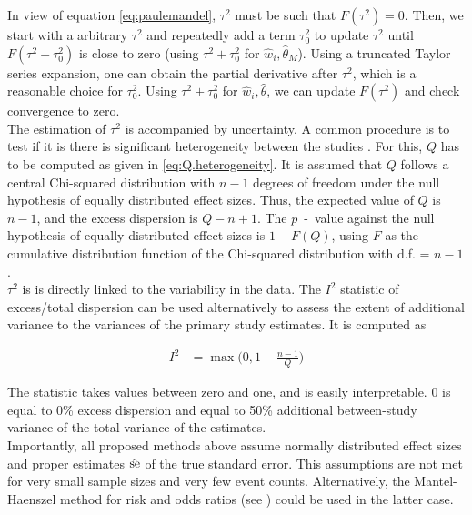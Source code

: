 \documentclass[11pt,a4paper,twoside]{book}\usepackage[]{graphicx}\usepackage[]{color}
\begin{document}
In view of equation \eqref{eq:paulemandel}, $\tau^2$ must be such that $F(\tau^2) = 0$. Then, we start with a arbitrary $\tau^2$ and repeatedly add a term $\tau_0^2$ to update $\tau^2$ until $F(\tau^2 + \tau_0^2)$ is close to zero (using $\tau^2 + \tau_0^2$ for $\hat{w}_i, \hat{\theta}_M$). Using a truncated Taylor series expansion, one can obtain the partial derivative after $\tau^2$, which is a reasonable choice for $\tau_0^2$. Using $\tau^2 + \tau_0^2$ for $\hat{w}_i, \hat{\theta}$, we can update $F(\tau^2)$ and check convergence to zero. \\
The estimation of $\tau^2$ is accompanied by uncertainty. A common procedure is to test if it is there is significant heterogeneity between the studies \cite[p. 109]{Intro.meta}. For this, $Q$ has to be computed as given in \eqref{eq:Q.heterogeneity}. It is assumed that $Q$ follows a central Chi-squared distribution with $n -1$ degrees of freedom under the null hypothesis of equally distributed effect sizes. Thus, the expected value of $Q$ is $n-1$, and the excess dispersion is $Q - n + 1$. The  $p$\hspace{0.4mm}~-~value against the null hypothesis of equally distributed effect sizes is $1 - F(Q)$, using $F$ as the cumulative distribution function of the Chi-squared distribution with d.f. = $n-1$. \\
$\tau^2$ is  is directly linked to the variability in the data. The $I^2$ statistic of excess/total dispersion can be used alternatively to assess the extent of additional variance to the variances of the primary study estimates. It is computed as

\begin{align}
I^2 &= \max\Big(0, 1 - \frac{n-1}{Q}\Big) \nonumber%
\end{align}

The statistic takes values between zero and one, and is easily interpretable. 0 is equal to 0\% excess dispersion and  equal to 50\% additional between-study variance of the total variance of the estimates. \\
Importantly, all proposed methods above assume normally distributed effect sizes and proper estimates $\hat{\operatorname{se}}$ of the true standard error. This assumptions are not met for very small sample sizes and very few event counts. Alternatively, the Mantel-Haenszel method for risk and odds ratios (see \eg \citealp{mantel.haenszel}) could be used in the latter case. 
\end{document}
